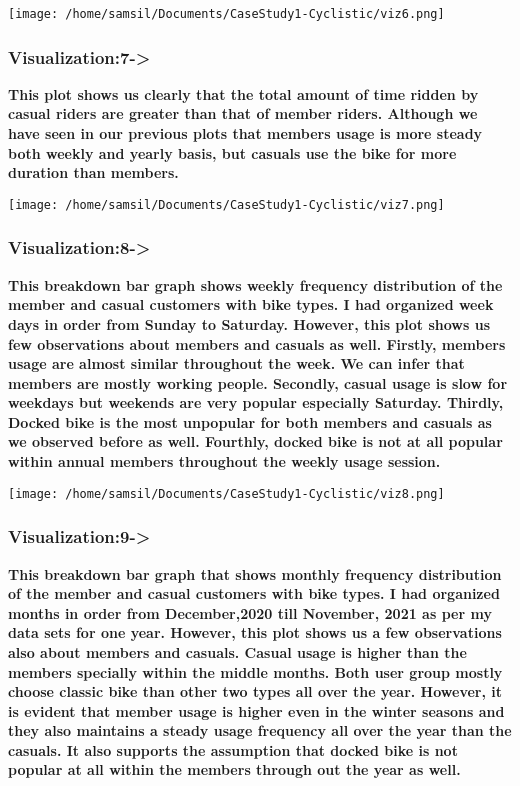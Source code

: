 \documentclass[
]{article}
\begin{document}
\texttt{[image: /home/samsil/Documents/CaseStudy1-Cyclistic/viz6.png]}

\hypertarget{visualization7-}{%
\subsubsection{\texorpdfstring{\textbf{Visualization:7-\textgreater{}}}{Visualization:7-\textgreater{}}}\label{visualization7-}}

\textbf{This plot shows us clearly that the total amount of time ridden
by casual riders are greater than that of member riders. Although we
have seen in our previous plots that members usage is more steady both
weekly and yearly basis, but casuals use the bike for more duration than
members.}

\texttt{[image: /home/samsil/Documents/CaseStudy1-Cyclistic/viz7.png]}

\hypertarget{visualization8-}{%
\subsubsection{\texorpdfstring{\textbf{Visualization:8-\textgreater{}}}{Visualization:8-\textgreater{}}}\label{visualization8-}}

\textbf{This breakdown bar graph shows weekly frequency distribution of
the member and casual customers with bike types. I had organized week
days in order from Sunday to Saturday. However, this plot shows us few
observations about members and casuals as well. Firstly, members usage
are almost similar throughout the week. We can infer that members are
mostly working people. Secondly, casual usage is slow for weekdays but
weekends are very popular especially Saturday. Thirdly, Docked bike is
the most unpopular for both members and casuals as we observed before as
well. Fourthly, docked bike is not at all popular within annual members
throughout the weekly usage session.}

\texttt{[image: /home/samsil/Documents/CaseStudy1-Cyclistic/viz8.png]}

\hypertarget{visualization9-}{%
\subsubsection{\texorpdfstring{\textbf{Visualization:9-\textgreater{}}}{Visualization:9-\textgreater{}}}\label{visualization9-}}

\textbf{This breakdown bar graph that shows monthly frequency
distribution of the member and casual customers with bike types. I had
organized months in order from December,2020 till November, 2021 as per
my data sets for one year. However, this plot shows us a few
observations also about members and casuals. Casual usage is higher than
the members specially within the middle months. Both user group mostly
choose classic bike than other two types all over the year. However, it
is evident that member usage is higher even in the winter seasons and
they also maintains a steady usage frequency all over the year than the
casuals. It also supports the assumption that docked bike is not popular
at all within the members through out the year as well.}
\end{document}
